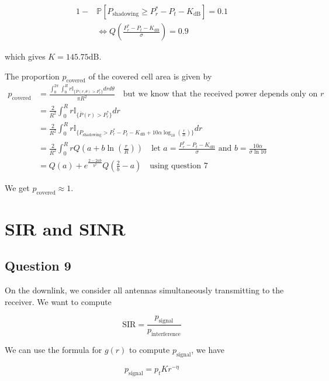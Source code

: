 \documentclass[]{article}
\begin{document}
	\begin{align}
		1 - &\mathbb{P}[P_{\text{shadowing}} \geq P_r^* - P_t - K_{\text{dB}}] = 0.1 \\
		&\iff Q\left(\frac{P_r^* - P_t - K_{\text{dB}}}{\sigma}\right) = 0.9
	\end{align}
	
	which gives $K = 145.75 \mathrm{dB}$.
	
	The proportion $p_{\text{covered}}$ of the covered cell area is given by
	\begin{align}
		p_{\text{covered}} &= \frac{\int_{0}^{2\pi}\int_{0}^{R} r\mathbb{I}_{\{\bar{P}(r,\theta) > P_r^*\} } dr d\theta}{\pi R^2} \quad \text{but we know that the received power depends only on $r$ } \\
		&= \frac{2}{R^2} \int_{0}^{R} r\mathbb{I}_{\{ \bar{P}(r) > P_r^* \}} dr \\
		&= \frac{2}{R^2} \int_{0}^{R} r\mathbb{I}_{\{ P_{\text{shadowing}} > P_r^* - P_t - K_{\text{dB}} + 10\alpha\log_{10}\left(\frac{r}{R}\right) \}}dr \\
		&= \frac{2}{R^2} \int_{0}^{R} rQ\left(a+b\ln\left(\frac{r}{R}\right)\right) \quad \text{let $a = \frac{P_r^* - P_t - K_{\text{dB}}}{\sigma}$ and $b = \frac{10\alpha}{\sigma\ln 10}$} \\
		&= Q(a) + e^{\frac{2 - 2ab}{b^2}}Q\left(\frac{2}{b} - a\right) \quad \text{using question 7}
	\end{align}
	
	We get $p_{\text{covered}} \approx 1$.
	
	\section{SIR and SINR}
	
	\subsection*{Question 9}
	
	On the downlink, we consider all antennas simultaneously transmitting to the receiver. We want to compute
	
	\begin{equation}
		\mathrm{SIR} = \frac{p_{\text{signal}}}{p_{\text{interference}}}
	\end{equation}
	
	We can use the formula for $g(r)$ to compute $p_{\text{signal}}$, we have
	
	\begin{equation}
		p_{\text{signal}} = p_tKr^{-\eta}
	\end{equation}
	
\end{document}
